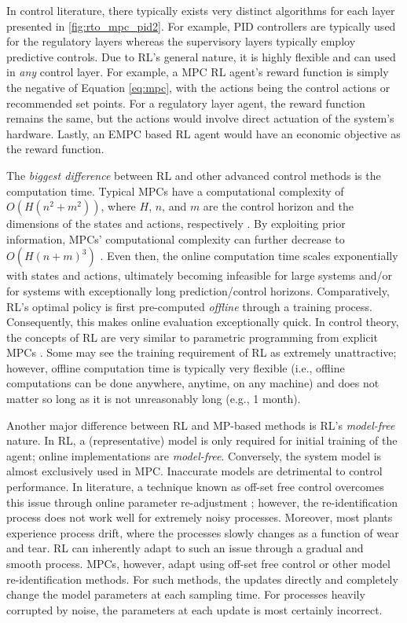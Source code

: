 In control literature, there typically exists very distinct algorithms for each layer presented in \ref{fig:rto_mpc_pid2}. For example, PID controllers are typically used for the regulatory layers whereas the supervisory layers typically employ predictive controls. Due to RL's general nature, it is highly flexible and can used in \textit{any} control layer. For example, a MPC RL agent's reward function is simply the negative of Equation \ref{eq:mpc}, with the actions being the control actions or recommended set points.  For a regulatory layer agent, the reward function remains the same, but the actions would involve direct actuation of the system's hardware.  Lastly, an EMPC based RL agent would have an economic objective as the reward function.

The \textit{biggest difference} between RL and other advanced control methods is the computation time. Typical MPCs have a computational complexity of $O(H(n^2 + m^2))$, where $H$, $n$, and $m$ are the control horizon and the dimensions of the states and actions, respectively \cite{mpc_comp_time}. By exploiting prior information, MPCs' computational complexity can further decrease to $O(H(n + m)^3)$ \cite{mpc_comp_time2, mpc_comp_time3, mpc_comp_time4}. Even then, the online computation time scales exponentially with states and actions, ultimately becoming infeasible for large systems and/or for systems with exceptionally long prediction/control horizons. Comparatively, RL's optimal policy is first pre-computed \textit{offline} through a training process.  Consequently, this makes online evaluation exceptionally quick.  In control theory, the concepts of RL are very similar to parametric programming from explicit MPCs \cite{explicit_MPC}.  Some may see the training requirement of RL as extremely unattractive; however, offline computation time is typically very flexible (i.e., offline computations can be done anywhere, anytime, on any machine) and does not matter so long as it is not unreasonably long (e.g., 1 month).

Another major difference between RL and MP-based methods is RL's \textit{model-free} nature.  In RL, a (representative) model is only required for initial training of the agent; online implementations are \textit{model-free}. Conversely, the system model is almost exclusively used in MPC. Inaccurate models are detrimental to control performance. In literature, a technique known as off-set free control overcomes this issue through online parameter re-adjustment \cite{offset_free_control}; however, the re-identification process does not work well for extremely noisy processes. Moreover, most plants experience process drift, where the processes slowly changes as a function of wear and tear.  RL can inherently adapt to such an issue through a gradual and smooth process.  MPCs, however, adapt using off-set free control or other model re-identification methods.  For such methods, the updates directly and completely change the model parameters at each sampling time.  For processes heavily corrupted by noise, the parameters at each update is most certainly incorrect. 

